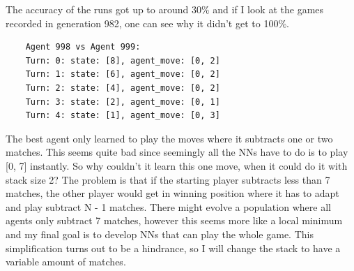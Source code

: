 \documentclass[11pt]{report}
\begin{document}
\begin{enumerate}
\begin{center}
    \end{center}
    The accuracy of the runs got up to around 30\% and if I look at the games recorded in generation 982, one can see why it didn't get to 100\%.
    \begin{verbatim}
    Agent 998 vs Agent 999:
    Turn: 0: state: [8], agent_move: [0, 2]
    Turn: 1: state: [6], agent_move: [0, 2]
    Turn: 2: state: [4], agent_move: [0, 2]
    Turn: 3: state: [2], agent_move: [0, 1]
    Turn: 4: state: [1], agent_move: [0, 3]
    \end{verbatim}
    The best agent only learned to play the moves where it subtracts one or two matches.
    This seems quite bad since seemingly all the NNs have to do is to play [0, 7] instantly.
    So why couldn't it learn this one move, when it could do it with stack size 2?
    The problem is that if the starting player subtracts less than 7 matches, the other player would get in winning position where it has to adapt and play subtract N - 1 matches.
    There might evolve a population where all agents only subtract 7 matches, however this seems more like a local minimum and my final goal is to develop NNs that can play the whole game.
    This simplification turns out to be a hindrance, so I will change the stack to have a variable amount of matches.


\end{enumerate}
\end{document}
